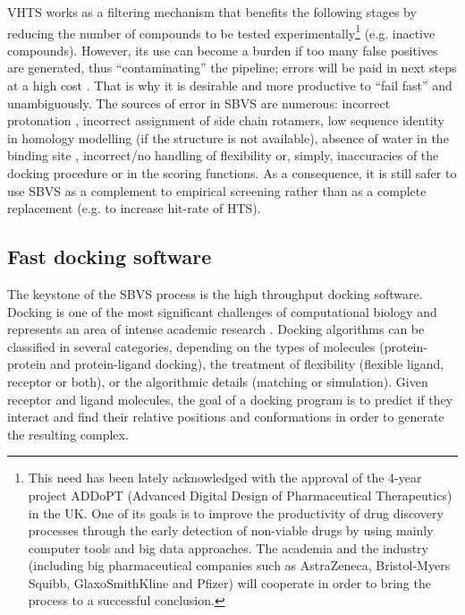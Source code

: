 VHTS works as a filtering mechanism that benefits the following stages by reducing the number of compounds to be tested experimentally\footnote{This need has been lately acknowledged with the approval of the 4-year project ADDoPT (Advanced Digital Design of Pharmaceutical Therapeutics) in the UK. One of its goals is to improve the productivity of drug discovery processes through the  early detection of non-viable drugs by using mainly computer tools and big data approaches. The academia and the industry (including big pharmaceutical companies such as AstraZeneca, Bristol-Myers Squibb, GlaxoSmithKline and Pfizer) will cooperate in order to bring the process to a successful conclusion.} (e.g. inactive compounds). However, its use can become a burden if too many false positives are generated, thus ``contaminating'' the pipeline; errors will be paid in next steps at a high cost \cite{moustakas_application_2007}.
That is why it is desirable and more productive to ``fail fast'' and unambiguously. The sources of error in SBVS are numerous: incorrect protonation \cite{totrov_flexible_2008}, incorrect assignment of side chain rotamers, low sequence identity in homology modelling (if the structure is not available), absence of water in the binding site \cite{de_beer_role_2010}, incorrect/no handling of flexibility or, simply, inaccuracies of the docking procedure or in the scoring functions. As a consequence, it is still safer to use SBVS as a complement \cite{doman_molecular_2002} to empirical screening rather than as a complete replacement (e.g. to increase hit-rate of HTS). 

\subsection{Fast docking software}

The keystone of the SBVS process is the high throughput docking software. Docking is one of the most significant challenges of computational biology and represents an area of intense academic research \cite{hartshorn_diverse_2007}. Docking algorithms can be classified in several categories, depending on the types of molecules (protein-protein and protein-ligand docking), the treatment of flexibility (flexible ligand, receptor or both), or the algorithmic details (matching or simulation). Given receptor and ligand molecules, the goal of a docking program is to predict if they interact and find their relative positions and conformations in order to generate the resulting complex. 

